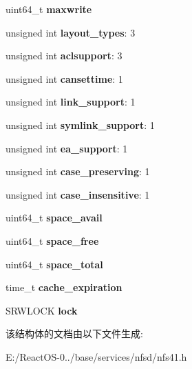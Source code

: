 \begin{DoxyCompactItemize}
uint64\+\_\+t {\bfseries maxwrite}
\item 
\mbox{\label{struct____nfs41__superblock_a2f9371312a30284fe88c6cb7736d2b38}} 
unsigned int {\bfseries layout\+\_\+types}\+: 3
\item 
\mbox{\label{struct____nfs41__superblock_a36b00c8166dbdd3f7740e88d2b92bf10}} 
unsigned int {\bfseries aclsupport}\+: 3
\item 
\mbox{\label{struct____nfs41__superblock_a8bc7268af95707c6c68d5d2da2cad283}} 
unsigned int {\bfseries cansettime}\+: 1
\item 
\mbox{\label{struct____nfs41__superblock_ac4e0bff88d50ab1aa2bef8a13e1a635a}} 
unsigned int {\bfseries link\+\_\+support}\+: 1
\item 
\mbox{\label{struct____nfs41__superblock_a1198d02df3f7344696dbe199e33858ef}} 
unsigned int {\bfseries symlink\+\_\+support}\+: 1
\item 
\mbox{\label{struct____nfs41__superblock_a337517153a3f94e6c9558b34804e81b8}} 
unsigned int {\bfseries ea\+\_\+support}\+: 1
\item 
\mbox{\label{struct____nfs41__superblock_a71276eb1ed10362c96f46329d6a79ecf}} 
unsigned int {\bfseries case\+\_\+preserving}\+: 1
\item 
\mbox{\label{struct____nfs41__superblock_a74ace38017f63a0eb5bac8c08678b1bb}} 
unsigned int {\bfseries case\+\_\+insensitive}\+: 1
\item 
\mbox{\label{struct____nfs41__superblock_a0b689e1c26abaa4e47974a44726c71e5}} 
uint64\+\_\+t {\bfseries space\+\_\+avail}
\item 
\mbox{\label{struct____nfs41__superblock_ab455c3210d212e412f99dbb2e91fc139}} 
uint64\+\_\+t {\bfseries space\+\_\+free}
\item 
\mbox{\label{struct____nfs41__superblock_a836678a70f03bf19f109dbb968613e42}} 
uint64\+\_\+t {\bfseries space\+\_\+total}
\item 
\mbox{\label{struct____nfs41__superblock_a929f489b7d34074cf8a686e2b6b7d445}} 
time\+\_\+t {\bfseries cache\+\_\+expiration}
\item 
\mbox{\label{struct____nfs41__superblock_ad9b2851c52118ee6b63a480250ed5453}} 
S\+R\+W\+L\+O\+CK {\bfseries lock}
\end{DoxyCompactItemize}


该结构体的文档由以下文件生成\+:\begin{DoxyCompactItemize}
\item 
E\+:/\+React\+O\+S-\/0../base/services/nfsd/nfs41.\+h\end{DoxyCompactItemize}
